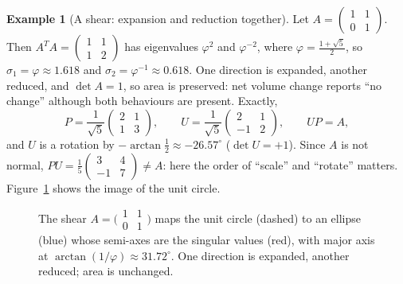 \documentclass[12pt]{article}
\theoremstyle{definition}
\newtheorem{example}[theorem]{Example}
\theoremstyle{remark}
\begin{document}
\begin{example}[A shear: expansion and reduction together]\label{ex:shear}
Let $A=\begin{pmatrix}1&1\\0&1\end{pmatrix}$. Then $A^TA=\begin{pmatrix}1&1\\1&2\end{pmatrix}$ has eigenvalues $\varphi^2$ and $\varphi^{-2}$, where $\varphi=\tfrac{1+\sqrt5}{2}$, so $\sigma_1=\varphi\approx1.618$ and $\sigma_2=\varphi^{-1}\approx0.618$. One direction is expanded, another reduced, and $\det A=1$, so area is preserved: net volume change reports ``no change'' although both behaviours are present. Exactly,
\[
P=\frac1{\sqrt5}\begin{pmatrix}2&1\\1&3\end{pmatrix},\qquad
U=\frac1{\sqrt5}\begin{pmatrix}2&1\\-1&2\end{pmatrix},\qquad UP=A,
\]
and $U$ is a rotation by $-\arctan\tfrac12\approx-26.57^\circ$ ($\det U=+1$). Since $A$ is not normal, $PU=\tfrac15\begin{pmatrix}3&4\\-1&7\end{pmatrix}\neq A$: here the order of ``scale'' and ``rotate'' matters. Figure~\ref{fig:ellipse} shows the image of the unit circle.
\end{example}

\begin{figure}[h]
\centering
{}
\caption{The shear $A=\bigl(\begin{smallmatrix}1&1\\0&1\end{smallmatrix}\bigr)$ maps the unit circle (dashed) to an ellipse (blue) whose semi-axes are the singular values (red), with major axis at $\arctan(1/\varphi)\approx31.72^\circ$. One direction is expanded, another reduced; area is unchanged.}
\label{fig:ellipse}
\end{figure}
\end{document}
